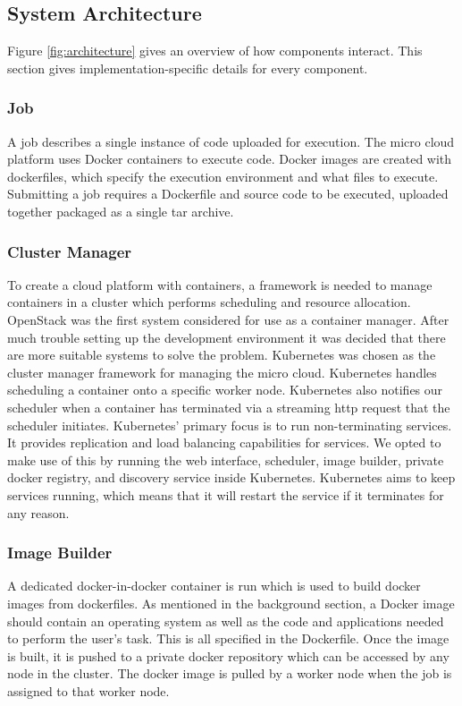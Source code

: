 \documentclass{sig-alternate-05-2015}
\begin{document}
\subsection{System Architecture}
Figure \ref{fig:architecture} gives an overview of how components interact. This section gives implementation-specific details for every component.

\subsubsection{Job}
A job describes a single instance of code uploaded for execution. 
The micro cloud platform uses Docker containers to execute code. Docker images are created with dockerfiles, which specify the execution environment and what files to execute. Submitting a job requires a Dockerfile and source code to be executed, uploaded together packaged as a single tar archive.  

\subsubsection{Cluster Manager}
To create a cloud platform with containers, a framework is needed to manage containers in a cluster which performs scheduling and resource allocation. OpenStack was the first system considered for use as a container manager. After much trouble setting up the development environment it was decided that there are more suitable systems to solve the problem. Kubernetes was chosen as the cluster manager framework for managing the micro cloud. Kubernetes handles scheduling a container onto a specific worker node. Kubernetes also notifies our scheduler when a container has terminated via a streaming http request that the scheduler initiates. Kubernetes' primary focus is to run non-terminating services. It provides replication and load balancing capabilities for services. We opted to make use of this by running the web interface, scheduler, image builder, private docker registry, and discovery service inside Kubernetes. Kubernetes aims to keep services running, which means that it will restart the service if it terminates for any reason.

\subsubsection{Image Builder}
A dedicated docker-in-docker container is run which is used to build docker images from dockerfiles. As mentioned in the background section, a Docker image should contain an operating system as well as the code and applications needed to perform the user's task. This is all specified in the Dockerfile. Once the image is built, it is pushed to a private docker repository which can be accessed by any node in the cluster. The docker image is pulled by a worker node when the job is assigned to that worker node.
\end{document}

